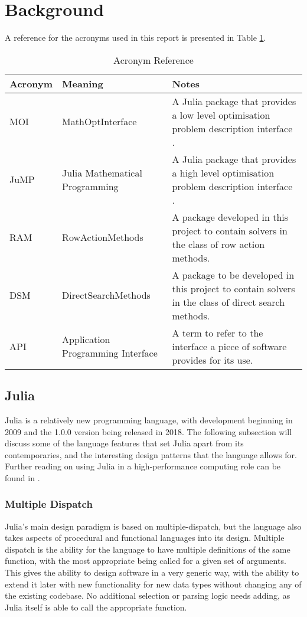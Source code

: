 \section{Background}\label{sec_background}

A reference for the acronyms used in this report is presented in Table \ref{table:TLA_ref}.

\begin{table}[h]
\centering
\begin{tabular}{|l|l|p{7cm}|}
\hline
Acronym & Meaning                           & Notes\\ \hline
MOI     & MathOptInterface                  & A Julia package that provides a low level optimisation problem description interface \cite{ManualMathOptInterface}. \\ \hline
JuMP    & Julia Mathematical Programming    & A Julia package that provides a high level optimisation problem description interface \cite{Dunning2017JuMP:Optimization}. \\ \hline
RAM     & RowActionMethods                  & A package developed in this project to contain solvers in the class of row action methods. \\ \hline
DSM     & DirectSearchMethods               & A package to be developed in this project to contain solvers in the class of direct search methods. \\ \hline
API     & Application Programming Interface & A term to refer to the interface a piece of software provides for its use. \\ \hline
\end{tabular}
\caption{Acronym Reference}
\label{table:TLA_ref}
\end{table}

\subsection{Julia}\label{sub_julia}
Julia is a relatively new programming language, with development beginning in 2009 and the 1.0.0 version being released in 2018. The following subsection will discuss some of the language features that set Julia apart from its contemporaries, and the interesting design patterns that the language allows for. Further reading on using Julia in a high-performance computing role can be found in \cite{Bezanson2017Julia:Computing}.

\subsubsection{Multiple Dispatch}
Julia's main design paradigm is based on multiple-dispatch, but the language also takes aspects of procedural and functional languages into its design. Multiple dispatch is the ability for the language to have multiple definitions of the same function, with the most appropriate being called for a given set of arguments. This gives the ability to design software in a very generic way, with the ability to extend it later with new functionality for new data types without changing any of the existing codebase. No additional selection or parsing logic needs adding, as Julia itself is able to call the appropriate function. 

